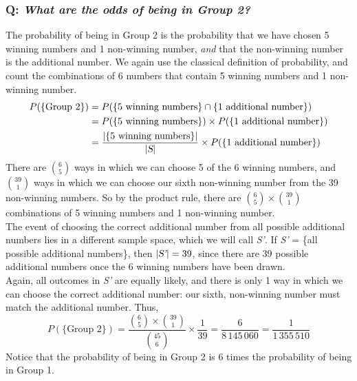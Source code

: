 \documentclass{article}
\begin{document}
\subsubsection*{Q: {\em What are the odds of being in Group 2?}}
The probability of being in Group 2 is the probability that we have chosen 5 winning numbers and 1 non-winning number, \textit{and} that the non-winning number is the additional number. We again use the classical definition of probability, and count the combinations of 6 numbers that contain 5 winning numbers and 1 non-winning number.
\begin{align*}
P(\{\text{Group 2}\})& =P(\{\text{5 winning numbers}\}\cap\{\text{1 additional number}\})\\
& =P(\{\text{5 winning numbers}\})\times P(\{\text{1 additional number}\})\\
& =\dfrac{|\{\text{5 winning numbers}\}|}{|\textsl{S}|}\times P(\{\text{1 additional number}\})
\end{align*}
There are $\binom{6}{5}$ ways in which we can choose 5 of the 6 winning numbers, and $\binom{39}{1}$ ways in which we can choose our sixth non-winning number from the 39 non-winning numbers. So by the product rule, there are $\binom{6}{5}\times\binom{39}{1}$ combinations of 5 winning numbers and 1 non-winning number.\\[1em]
The event of choosing the correct additional number from all possible additional numbers lies in a different sample space, which we will call \textsl{S'}. If \textsl{S'} = \{all possible additional numbers\}, then $|\textsl{S'}|=39$, since there are 39 possible additional numbers once the 6 winning numbers have been drawn.\\
Again, all outcomes in \textsl{S'} are equally likely, and there is only 1 way in which we can choose the correct additional number: our sixth, non-winning number must match the additional number. Thus,
\begin{equation*}
P(\{\text{Group 2}\})=\dfrac{\binom{6}{5}\times\binom{39}{1}}{\binom{45}{6}}\times \dfrac{1}{39}=\dfrac{6}{8\,145\,060}=\dfrac{1}{1\,355\,510}
\end{equation*}
Notice that the probability of being in Group 2 is 6 times the probability of being in Group 1.
\end{document}
